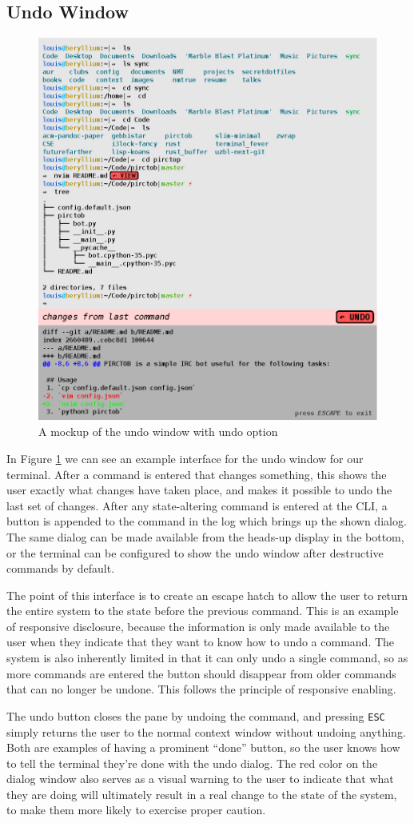 \subsection{Undo Window}

\begin{figure}[H]
  \centering
  \includegraphics[width=0.8\linewidth]{figures/interface/undo.eps}
  \caption{A mockup of the undo window with undo option}
  \label{fig:undo}
\end{figure}

In Figure \ref{fig:undo} we can see an example interface for the undo window for
our terminal. After a command is entered that changes something, this shows the
user exactly what changes have taken place, and makes it possible to undo the
last set of changes. After any state-altering command is entered at the CLI, a
button is appended to the command in the log which brings up the shown
dialog. The same dialog can be made available from the heads-up display in the
bottom, or the terminal can be configured to show the undo window after
destructive commands by default.

The point of this interface is to create an escape hatch to allow the user to
return the entire system to the state before the previous command. This is an
example of responsive disclosure, because the information is only made available
to the user when they indicate that they want to know how to undo a command. The
system is also inherently limited in that it can only undo a single command, so
as more commands are entered the button should disappear from older commands
that can no longer be undone. This follows the principle of responsive enabling.

The undo button closes the pane by undoing the command, and pressing
\texttt{ESC} simply returns the user to the normal context window without
undoing anything. Both are examples of having a prominent ``done'' button, so
the user knows how to tell the terminal they're done with the undo dialog. The
red color on the dialog window also serves as a visual warning to the user to
indicate that what they are doing will ultimately result in a real change to the
state of the system, to make them more likely to exercise proper caution.
